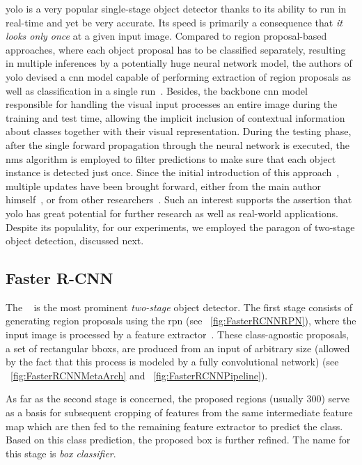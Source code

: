 \Gls{yolo} is a very popular single-stage object detector thanks to its ability to run in real-time and yet be very accurate. Its speed is primarily a consequence that \emph{it looks only once} at a given input image. Compared to region proposal-based approaches, where each object proposal has to be classified separately, resulting in multiple inferences by a potentially huge neural network model, the authors of \gls{yolo} devised a \gls{cnn} model capable of performing extraction of region proposals as well as classification in a single run~\cite{redmon2016yolo}. Besides, the backbone \gls{cnn} model responsible for handling the visual input processes an entire image during the training and test time, allowing the implicit inclusion of contextual information about classes together with their visual representation. During the testing phase, after the single forward propagation through the neural network is executed, the \gls{nms} algorithm is employed to filter predictions to make sure that each object instance is detected just once. Since the initial introduction of this approach~\cite{redmon2016yolo}, multiple updates have been brought forward, either from the main author himself~\cite{redmon2017yolo9000, redmon2018yolov3}, or from other researchers~\cite{wang2020yolov4, wong2019yolonano}. Such an interest supports the assertion that \gls{yolo} has great potential for further research as well as real-world applications. Despite its populality, for our experiments, we employed the paragon of two-stage object detection, discussed next.

\subsection{Faster R-CNN}
\label{ssec:FasterRCNN}

The \fasterrcnn{}~\cite{ren2017fasterrcnn} is the most prominent \emph{two-stage} object detector. The first stage consists of generating region proposals using the \gls{rpn} (see \figstr{}~\ref{fig:FasterRCNNRPN}), where the input image is processed by a feature extractor~\cite{huang2017speedacctradeoff}. These class-agnostic proposals, a set of rectangular \glspl{bbox}, are produced from an input of arbitrary size (allowed by the fact that this process is modeled by a fully convolutional network) (see \figstr{}~\ref{fig:FasterRCNNMetaArch} and \figstr~\ref{fig:FasterRCNNPipeline}).

As far as the second stage is concerned, the proposed regions (usually $300$) serve as a basis for subsequent cropping of features from the same intermediate feature map which are then fed to the remaining feature extractor to predict the class. Based on this class prediction, the proposed box is further refined. The name for this stage is \emph{box classifier}.

